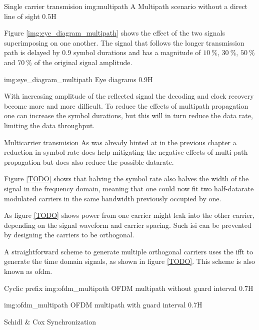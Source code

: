 \begin{subchapter}{Single carrier transmision}
               {img:multipath}
               {A Multipath scenario without a direct line of sight}
               {0.5}{H}

  Figure \ref{img:eye_diagram_multipath} shows the effect of the
  two signals superimposing on one another.
  The signal that follows the longer transmission path
  is delayed by $0.9$ symbol durations and has a magnitude
  of $\SI{10}{\percent}$, $\SI{30}{\percent}$, $\SI{50}{\percent}$ and
  $\SI{70}{\percent}$ of the original signal amplitude.

               {img:eye_diagram_multipath}
               {Eye diagrams}
               {0.9}{H}

  With increasing amplitude of the reflected signal the decoding
  and clock recovery become more and more difficult.
  To reduce the effects of multipath propagation one can
  increase the symbol durations, but this will in turn
  reduce the data rate, limiting the data throughput.
\end{subchapter}

\begin{subchapter}{Multicarrier transmision}
  As was already hinted at in the previous chapter a reduction
  in symbol rate does help mitigating the negative effects of
  multi-path propagation but does also reduce the possible datarate.

  Figure \ref{TODO} shows that halving the symbol rate also
  halves the width of the signal in the frequency domain,
  meaning that one could now fit two half-datarate modulated carriers in the
  same bandwidth previously occupied by one.

  As figure \ref{TODO} shows power from one carrier might leak
  into the other carrier, depending on the signal waveform and
  carrier spacing. Such \gls{isi} can be prevented by designing
  the carriers to be orthogonal.

  A straightforward scheme to generate multiple orthogonal
  carriers uses the \gls{ifft} to generate the time domain
  signals, as shown in figure \ref{TODO}.
  This scheme is also known as \acrlong{ofdm}.

\end{subchapter}

\begin{subchapter}{Cyclic prefix}
               {img:ofdm_multipath}
               {OFDM multipath without guard interval}
               {0.7}{H}

               {img:ofdm_multipath}
               {OFDM multipath with guard interval}
               {0.7}{H}
\end{subchapter}

\begin{subchapter}{Schidl \& Cox Synchronization}
\end{subchapter}
